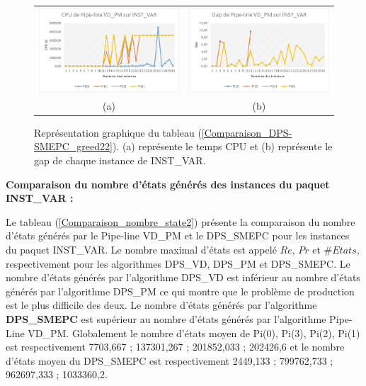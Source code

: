 \begin{figure}[H]
	\centering
	\begin{tabular}{c c}
		\includegraphics[width=9cm]{images_these/CPU_Pipe_INST_VAR.pdf}&
		\includegraphics[width=9cm]{images_these/Gap_Pipe_INST_VAR.pdf}
		\\
		(a) & (b)
	\end{tabular}
	\caption[Représentation graphique du CPU et du gap du tableau (\ref{Comparaison_DPS-SMEPC_greed22})]{Représentation graphique du tableau (\ref{Comparaison_DPS-SMEPC_greed22}). (a) représente le temps CPU et (b) représente le gap de chaque instance de INST\_VAR.}\label{gap_cpu_pipe_INST_VAR}
\end{figure}

\textbf{Comparaison du nombre d'états générés des instances du paquet INST\_VAR :}

Le tableau (\ref{Comparaison_nombre_state2}) présente la comparaison du nombre d'états générés par le  Pipe-line VD\_PM et le DPS\_SMEPC pour les instances du paquet INST\_VAR. Le nombre maximal d'états est appelé $Re$, $Pr$ et $\# Etats$, respectivement pour les algorithmes DPS\_VD, DPS\_PM et DPS\_SMEPC. Le nombre d'états générés par l'algorithme DPS\_VD est inférieur au nombre d'états générés par l'algorithme DPS\_PM ce qui montre que le problème de production est le plus difficile des deux. Le nombre d'états générés par l'algorithme \textbf{DPS\_SMEPC} est supérieur au nombre d'états générés par l'algorithme Pipe-Line VD\_PM.
Globalement le nombre d'états moyen de Pi(0), Pi(3), Pi(2), Pi(1) est respectivement 
7703,667 ; 137301,267 ; 201852,033 ; 202426,6
et le nombre d'états moyen du DPS\_SMEPC est respectivement
 2449,133 ; 799762,733 ; 962697,333 ; 1033360,2. 

